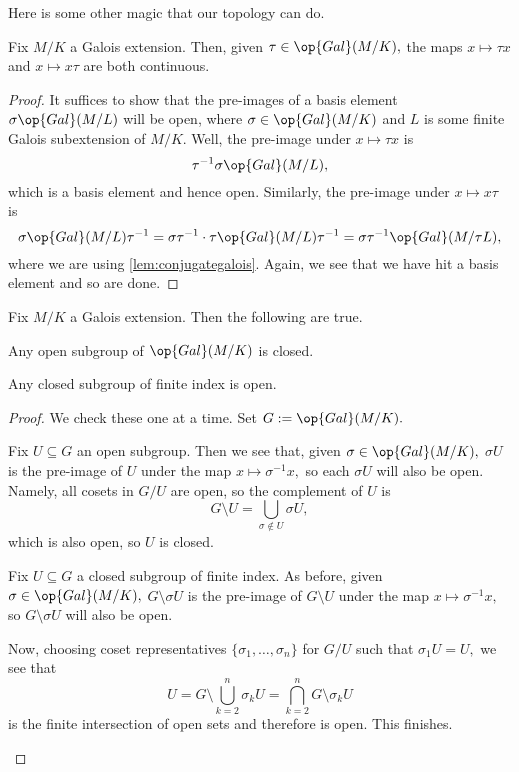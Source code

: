 Here is some other magic that our topology can do.
\begin{proposition}
	Fix $M/K$ a Galois extension. Then, given $\tau\in\op{Gal}(M/K),$ the maps $x\mapsto\tau x$ and $x\mapsto x\tau$ are both continuous.
\end{proposition}
\begin{proof}
	It suffices to show that the pre-images of a basis element $\sigma\op{Gal}(M/L)$ will be open, where $\sigma\in\op{Gal}(M/K)$ and $L$ is some finite Galois subextension of $M/K.$ Well, the pre-image under $x\mapsto\tau x$ is
	\[\tau^{-1}\sigma\op{Gal}(M/L),\]
	which is a basis element and hence open. Similarly, the pre-image under $x\mapsto x\tau$ is
	\[\sigma\op{Gal}(M/L)\tau^{-1}=\sigma\tau^{-1}\cdot\tau\op{Gal}(M/L)\tau^{-1}=\sigma\tau^{-1}\op{Gal}(M/\tau L),\]
	where we are using \autoref{lem:conjugategalois}. Again, we see that we have hit a basis element and so are done.
\end{proof}
\begin{proposition}
	Fix $M/K$ a Galois extension. Then the following are true.
	\begin{listalph}
		\item Any open subgroup of $\op{Gal}(M/K)$ is closed.
		\item Any closed subgroup of finite index is open.
	\end{listalph}
\end{proposition}
\begin{proof}
	We check these one at a time. Set $G:=\op{Gal}(M/K).$
	\begin{listalph}
		\item Fix $U\subseteq G$ an open subgroup. Then we see that, given $\sigma\in\op{Gal}(M/K),$ $\sigma U$ is the pre-image of $U$ under the map $x\mapsto\sigma^{-1}x,$ so each $\sigma U$ will also be open. Namely, all cosets in $G/U$ are open, so the complement of $U$ is
		\[G\setminus U=\bigcup_{\sigma\notin U}\sigma U,\]
		which is also open, so $U$ is closed.
		\item Fix $U\subseteq G$ a closed subgroup of finite index. As before, given $\sigma\in\op{Gal}(M/K),$ $G\setminus\sigma U$ is the pre-image of $G\setminus U$ under the map $x\mapsto\sigma^{-1}x,$ so $G\setminus\sigma U$ will also be open.

		Now, choosing coset representatives $\{\sigma_1,\ldots,\sigma_n\}$ for $G/U$ such that $\sigma_1U=U,$ we see that
		\[U=G\setminus\bigcup_{k=2}^n\sigma_kU=\bigcap_{k=2}^nG\setminus\sigma_kU\]
		is the finite intersection of open sets and therefore is open. This finishes.
		\qedhere
	\end{listalph}
\end{proof}
